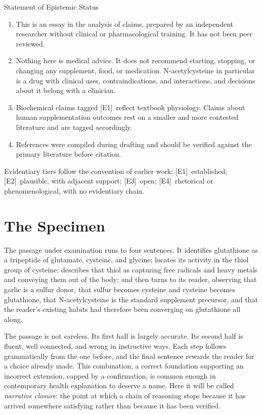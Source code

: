 \documentclass[11pt,a4paper]{article}
\theoremstyle{plain}
\theoremstyle{definition}
\theoremstyle{remark}
\newcommand{\tier}[1]{\textup{\textsc{[#1]}}}
\newcommand{\Eone}{\tier{E1}}
\newcommand{\Etwo}{\tier{E2}}
\newcommand{\Ethree}{\tier{E3}}
\newcommand{\Efour}{\tier{E4}}
\begin{document}
\begin{statusbox}{Statement of Epistemic Status}
\small
\begin{enumerate}[leftmargin=1.4em,itemsep=2pt]
\item This is an essay in the analysis of claims, prepared by an independent researcher without clinical or pharmacological training. It has not been peer reviewed.
\item Nothing here is medical advice. It does not recommend starting, stopping, or changing any supplement, food, or medication. N-acetylcysteine in particular is a drug with clinical uses, contraindications, and interactions, and decisions about it belong with a clinician.
\item Biochemical claims tagged \Eone\ reflect textbook physiology. Claims about human supplementation outcomes rest on a smaller and more contested literature and are tagged accordingly.
\item References were compiled during drafting and should be verified against the primary literature before citation.
\end{enumerate}
\end{statusbox}

\noindent Evidentiary tiers follow the convention of earlier work: \Eone\ established; \Etwo\ plausible, with adjacent support; \Ethree\ open; \Efour\ rhetorical or phenomenological, with no evidentiary chain.

\section{The Specimen}

The passage under examination runs to four sentences. It identifies glutathione as a tripeptide of glutamate, cysteine, and glycine; locates its activity in the thiol group of cysteine; describes that thiol as capturing free radicals and heavy metals and conveying them out of the body; and then turns to its reader, observing that garlic is a sulfur donor, that sulfur becomes cysteine and cysteine becomes glutathione, that N-acetylcysteine is the standard supplement precursor, and that the reader's existing habits had therefore been converging on glutathione all along.

The passage is not careless. Its first half is largely accurate. Its second half is fluent, well connected, and wrong in instructive ways. Each step follows grammatically from the one before, and the final sentence rewards the reader for a choice already made. This combination, a correct foundation supporting an incorrect extension, capped by a confirmation, is common enough in contemporary health explanation to deserve a name. Here it will be called \emph{narrative closure}: the point at which a chain of reasoning stops because it has arrived somewhere satisfying rather than because it has been verified.
\end{document}
